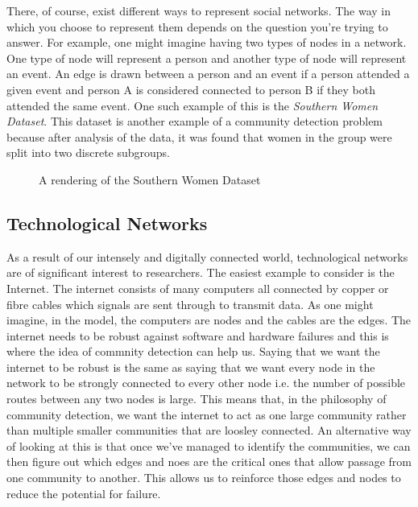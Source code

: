 There, of course, exist different ways to represent social networks. The way in which you choose to represent them depends on the question you're trying to answer. For example, one might imagine having two types of nodes in a network. One type of node will represent a person and another type of node will represent an event. An edge is drawn between a person and an event if a person attended a given event and person A is considered connected to person B if they both attended the same event. One such example of this is the \emph{Southern Women Dataset}.\cite{konect:southernwomen} This dataset is another example of a community detection problem because after analysis of the data, it was found that women in the group were split into two discrete subgroups.

\begin{figure}
    \begin{center}
    \end{center}
    \caption{A rendering of the Southern Women Dataset}
    \label{fig:southernwomen}
\end{figure}

\subsection{Technological Networks}\label{sec:Technological Networks}
As a result of our intensely and digitally connected world, technological networks are of significant interest to researchers. The easiest example to consider is the Internet. The internet consists of many computers all connected by copper or fibre cables which signals are sent through to transmit data. As one might imagine, in the model, the computers are nodes and the cables are the edges. The internet needs to be robust against software and hardware failures and this is where the idea of commnity detection can help us. Saying that we want the internet to be robust is the same as saying that we want every node in the network to be strongly connected to every other node i.e. the number of possible routes between any two nodes is large. This means that, in the philosophy of community detection, we want the internet to act as one large community rather than multiple smaller communities that are loosley connected. An alternative way of looking at this is that once we've managed to identify the communities, we can then figure out which edges and noes are the critical ones that allow passage from one community to another. This allows us to reinforce those edges and nodes to reduce the potential for failure.

